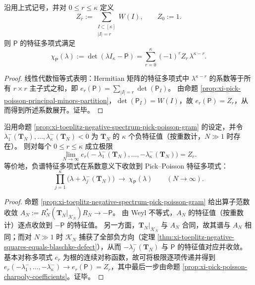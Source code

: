 \begin{proposition}\label{prop:xi-pick-poisson-charpoly-coefficients}
沿用上式记号，并对 \(0\le r\le\kappa\) 定义
\[
Z_r:=\sum_{\substack{I\subset[\kappa]\\|I|=r}}W(I),\qquad Z_0:=1.
\]
则 \(\mathsf P\) 的特征多项式满足
\[
\boxed{\;
\chi_{\mathsf P}(\lambda):=\det(\lambda I_\kappa-\mathsf P)
=\sum_{r=0}^{\kappa}(-1)^r Z_r\,\lambda^{\kappa-r}.\;}
\]
\end{proposition}
\begin{proof}
线性代数恒等式表明：Hermitian 矩阵的特征多项式中 \(\lambda^{\kappa-r}\) 的系数等于所有 \(r\times r\) 主子式之和，即
\(
e_r(\mathsf P)=\sum_{|I|=r}\det(\mathsf P_I)
\)。
由命题 \ref{prop:xi-pick-poisson-principal-minors-partition}，\(\det(\mathsf P_I)=W(I)\)，故 \(e_r(\mathsf P)=Z_r\)，从而得到所述系数展开。证毕。
\end{proof}

\begin{proposition}\label{prop:xi-toeplitz-negative-spectrum-coefficient-limit}
沿用命题 \ref{prop:xi-toeplitz-negative-spectrum-pick-poisson-gram} 的设定，并令
\(\lambda_1^-(\mathbf{T}_N),\dots,\lambda_\kappa^-(\mathbf{T}_N)<0\)
为 \(\mathbf{T}_N\) 的 \(\kappa\) 个负特征值（按重数计，\(N\gg 1\) 时存在）。
则对每个 \(0\le r\le\kappa\) 成立极限
\[
\boxed{\;
\lim_{N\to\infty}e_r\!\bigl(-\lambda_1^-(\mathbf{T}_N),\dots,-\lambda_\kappa^-(\mathbf{T}_N)\bigr)=Z_r.\;}
\]
等价地，负谱特征多项式在系数意义下收敛到 Pick--Poisson 特征多项式：
\[
\boxed{\;
\prod_{j=1}^{\kappa}\bigl(\lambda+\lambda_j^-(\mathbf{T}_N)\bigr)\ \longrightarrow\ \chi_{\mathsf P}(\lambda)\qquad(N\to\infty).\;}
\]
\end{proposition}
\begin{proof}
命题 \ref{prop:xi-toeplitz-negative-spectrum-pick-poisson-gram} 给出算子范数收敛
\(
A_N:=R_N^\ast(\mathbf{T}_N|_{\mathcal K_N})R_N\to-\mathsf P
\)。
由 Weyl 不等式，\(A_N\) 的特征值（按重数计）逐点收敛到 \(-\mathsf P\) 的特征值。
另一方面，\(\mathbf{T}_N|_{\mathcal K_N}\) 与 \(A_N\) 合同，故其谱与 \(A_N\) 相同；而对 \(N\gg 1\) 时 \(\mathcal K_N\) 捕获了全部负方向（定理 \ref{thm:xi-toeplitz-negative-squares-equals-blaschke-defect}），从而 \(-\lambda_j^-(\mathbf{T}_N)\) 与 \(\mathsf P\) 的特征值对应并收敛。
基本对称多项式 \(e_r\) 为根的连续对称函数，故可将极限逐项传递并得到
\(
e_r(-\lambda_1^-,\dots,-\lambda_\kappa^-)\to e_r(\mathsf P)=Z_r
\)，其中最后一步由命题 \ref{prop:xi-pick-poisson-charpoly-coefficients}。证毕。
\end{proof}

